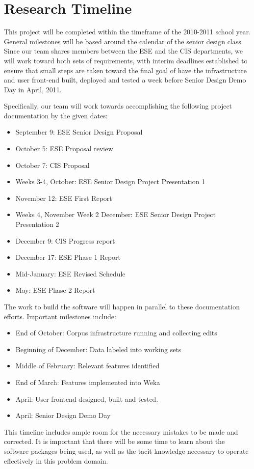 \documentclass[letterpaper]{sig-alternate}
\begin{document}
\section{Research Timeline}
\label{sec:research_timeline}
This project will be completed within the timeframe of the 2010-2011 school year. General milestones will be based around the calendar of the senior design class. Since our team shares members between the ESE and the CIS departments, we will work toward both sets of requirements, with interim deadlines established to ensure that small steps are taken toward the final goal of have the infrastructure and user front-end built, deployed and tested a week before Senior Design Demo Day in April, 2011.

Specifically, our team will work towards accomplishing the following project documentation by the given dates:
\begin{itemize}
\item September 9: ESE Senior Design Proposal
\item October 5: ESE Proposal review
\item October 7: CIS Proposal
\item Weeks 3-4, October: ESE Senior Design Project Presentation 1
\item November 12: ESE First Report
\item Weeks 4, November Week 2 December: ESE Senior Design Project Presentation 2
\item December 9: CIS  Progress report 
\item December 17: ESE Phase 1 Report
\item Mid-January: ESE Revised Schedule
\item May: ESE Phase 2 Report
\end{itemize}

The work to build the software will happen in parallel to these documentation efforts. Important milestones include:

\begin{itemize}
\item End of October: Corpus infrastructure running and collecting edits
\item Beginning of December: Data labeled into working sets
\item Middle of February: Relevant features identified
\item End of March: Features implemented into Weka
\item April: User frontend designed, built and tested.
\item April: Senior Design Demo Day
\end{itemize}
This timeline includes ample room for the necessary mistakes to be made and corrected. It is important that there will be some time to learn about the software packages being used, as well as the tacit knowledge necessary to operate effectively in this problem domain.



\vspace{150pt}
\end{document}
